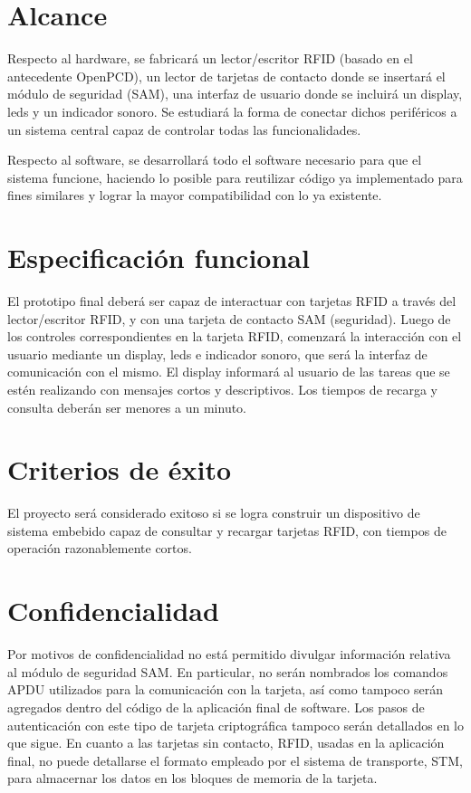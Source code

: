 \section{Alcance}

Respecto al hardware, se fabricará un lector/escritor RFID (basado en el antecedente OpenPCD), un lector de tarjetas de contacto donde se insertará el módulo de seguridad (SAM), una interfaz de usuario donde se incluirá un display, leds y  un indicador sonoro. Se estudiará la forma de conectar dichos periféricos a un sistema central capaz de controlar todas las funcionalidades.

\bigskip
Respecto al software, se desarrollará todo el software necesario para que el sistema funcione, haciendo lo posible para reutilizar código ya implementado para fines similares y lograr la mayor compatibilidad con lo ya existente.


\section{Especificación funcional}

El prototipo final deberá ser capaz de interactuar con tarjetas RFID a través del \\
lector/escritor RFID, y con una tarjeta de contacto SAM (seguridad). Luego de los controles correspondientes en la tarjeta RFID, comenzará la interacción con el usuario mediante un display, leds e indicador sonoro, que será la interfaz de comunicación con el mismo. El display informará al usuario de las tareas que se estén realizando con mensajes cortos y descriptivos. Los tiempos de recarga y consulta deberán ser menores a un minuto.


\section{Criterios de éxito}

El proyecto será considerado exitoso si se logra construir un dispositivo de sistema embebido capaz de consultar y recargar tarjetas RFID, con tiempos de operación razonablemente cortos.

\section{Confidencialidad}

Por motivos de confidencialidad no está permitido divulgar información relativa al módulo de seguridad SAM. 
En particular, no serán nombrados los comandos APDU utilizados para la comunicación con la tarjeta, así como 
tampoco serán agregados dentro del código de la aplicación final de software. Los pasos de autenticación
con este tipo de tarjeta criptográfica tampoco serán detallados en lo que sigue.
En cuanto a las tarjetas sin contacto, RFID, usadas en la aplicación final, no puede detallarse el formato
empleado por el sistema de transporte, STM, para almacernar los datos en los bloques de memoria de la tarjeta.